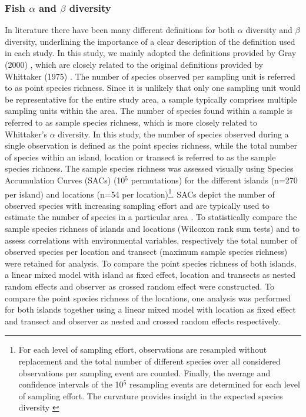 \subsubsection{Fish $\alpha$ and $\beta$ diversity}
\label{sect:div}
 
In literature there have been many different definitions for both $\alpha$ diversity and $\beta$ diversity, underlining the importance of a clear description of the definition used in each study. In this study, we mainly adopted the definitions provided by Gray (2000) \citep{Gray2000TheShelf}, which are closely related to the original definitions provided by Whittaker (1975) \citep{Whittaker1975CommunitiesEcosystems}. The number of species observed per sampling unit is referred to as point species richness. Since it is unlikely that only one sampling unit would be representative for the entire study area, a sample typically comprises multiple sampling units within the area. The number of species found within a sample is referred to as sample species richness, which is more closely related to Whittaker's $\alpha$ diversity. In this study, the number of species observed during a single observation is defined as the point species richness, while the total number of species within an island, location or transect is referred to as the sample species richness. The sample species richness was assessed visually using Species Accumulation Curves (SACs) (10$^{5}$ permutations) for the different islands (n=270 per island) and locations (n=54 per location)\footnote{For each level of sampling effort, observations are resampled without replacement and the total number of different species over all considered observations per sampling event are counted. Finally, the average and confidence intervals of the 10$^{5}$ resampling events are determined for each level of sampling effort. The curvature provides insight in the expected species diversity \citep{Chao2004NonparametricSampling}}. SACs depict the number of observed species with increasing sampling effort and are typically used to estimate the number of species in a particular area \citep{Magurran}. To statistically compare the sample species richness of islands and locations (Wilcoxon rank sum tests) and to assess correlations with environmental variables, respectively the total number of observed species per location and transect (maximum sample species richness) were retained for analysis. To compare the point species richness of both islands, a linear mixed model with island as fixed effect, location and transects as nested random effects and observer as crossed random effect were constructed. To compare the point species richness of the locations, one analysis was performed for both islands together using a linear mixed model with location as fixed effect and transect and observer as nested and crossed random effects respectively. 

